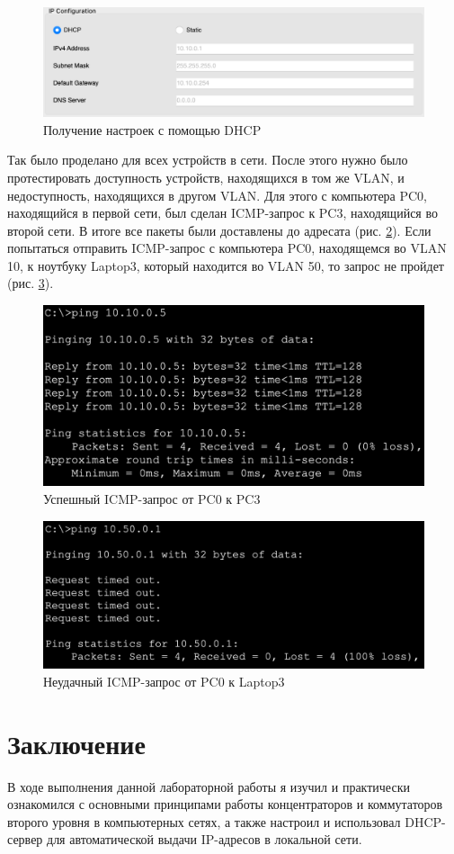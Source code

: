 \documentclass[a4paper, 14pt]{extarticle}
\begin{document}
\begin{figure}[H]
  \centering
  \includegraphics[width=\textwidth]{images/task-2/dhcp-request.png}
  \caption{Получение настроек с помощью DHCP}
  \label{fig:task-2:dhcp-request}
\end{figure}

Так было проделано для всех устройств в сети. После этого нужно было
протестировать доступность устройств, находящихся в том же VLAN, и
недоступность, находящихся в другом VLAN. Для этого с компьютера PC0,
находящийся в первой сети, был сделан ICMP-запрос к PC3, находящийся во второй
сети. В итоге все пакеты были доставлены до адресата (рис.
\ref{fig:task-2:ping-success}). Если попытаться отправить ICMP-запрос с
компьютера PC0, находящемся во VLAN 10, к ноутбуку Laptop3, который находится во
VLAN 50, то запрос не пройдет (рис. \ref{fig:task-2:ping-failed}).

\begin{figure}[H]
  \centering
  \includegraphics[width=\textwidth]{images/task-2/ping-success.png}
  \caption{Успешный ICMP-запрос от PC0 к PC3}
  \label{fig:task-2:ping-success}
\end{figure}

\begin{figure}[H]
  \centering
  \includegraphics[width=\textwidth]{images/task-2/ping-failed.png}
  \caption{Неудачный ICMP-запрос от PC0 к Laptop3}
  \label{fig:task-2:ping-failed}
\end{figure}

\section{Заключение}

В ходе выполнения данной лабораторной работы я изучил и практически ознакомился
с основными принципами работы концентраторов и коммутаторов второго уровня в
компьютерных сетях, а также настроил и использовал DHCP-сервер для
автоматической выдачи IP-адресов в локальной сети.
\end{document}
